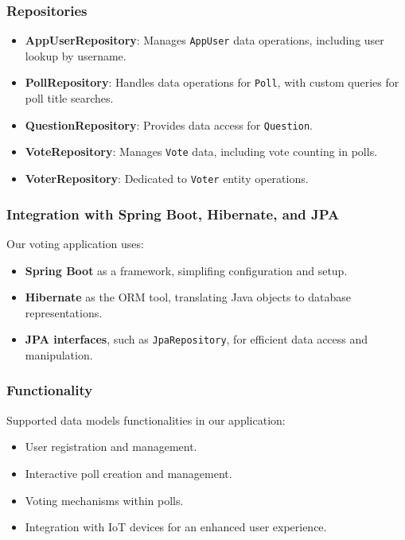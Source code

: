 \subsubsection{Repositories}
\begin{itemize}
    \item \textbf{AppUserRepository}: Manages \texttt{AppUser} data operations, including user lookup by username.
    \item \textbf{PollRepository}: Handles data operations for \texttt{Poll}, with custom queries for poll title searches.
    \item \textbf{QuestionRepository}: Provides data access for \texttt{Question}.
    \item \textbf{VoteRepository}: Manages \texttt{Vote} data, including vote counting in polls.
    \item \textbf{VoterRepository}: Dedicated to \texttt{Voter} entity operations.
\end{itemize}

\subsubsection{Integration with Spring Boot, Hibernate, and JPA}
Our voting application uses:

\begin{itemize}
    \item \textbf{Spring Boot} as a framework, simplifing configuration and setup.
    \item \textbf{Hibernate} as the ORM tool, translating Java objects to database representations.
    \item \textbf{JPA interfaces}, such as \texttt{JpaRepository}, for efficient data access and manipulation.
\end{itemize}

\subsubsection{Functionality}

Supported data models functionalities in our application:
\begin{itemize}
    \item User registration and management.
    \item Interactive poll creation and management.
    \item Voting mechanisms within polls.
    \item Integration with IoT devices for an enhanced user experience.
\end{itemize}

